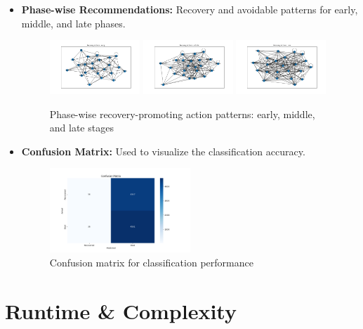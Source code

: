 \documentclass[11pt]{article}
\begin{document}
\begin{itemize}[noitemsep]
    \item \textbf{Phase-wise Recommendations:} Recovery and avoidable patterns for early, middle, and late phases.
    \begin{figure}[H]
        \centering
        \includegraphics[width=0.32\textwidth]{recovery_early.png}
        \includegraphics[width=0.32\textwidth]{recovery_middle.png}
        \includegraphics[width=0.32\textwidth]{recovery_late.png}
        \caption{Phase-wise recovery-promoting action patterns: early, middle, and late stages}
    \end{figure}

    \item \textbf{Confusion Matrix:} Used to visualize the classification accuracy.
    \begin{figure}[H]
        \centering
        \includegraphics[width=0.5\textwidth]{confusion_matrix.png}
        \caption{Confusion matrix for classification performance}
    \end{figure}
\end{itemize}

\section{Runtime \& Complexity}
\end{document}

